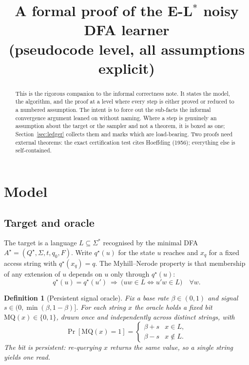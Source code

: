\documentclass[11pt]{article}
\title{A formal proof of the E-L$^*$ noisy DFA learner\\[2pt]
\large (pseudocode level, all assumptions explicit)}
\author{}
\date{}
\newtheorem{definition}{Definition}
\newcommand{\MQ}{\mathrm{MQ}}
\begin{document}
\maketitle

\begin{abstract}
This is the rigorous companion to the informal correctness note. It states the
model, the algorithm, and the proof at a level where every step is either proved
or reduced to a numbered assumption. The intent is to force out the sub-facts the
informal convergence argument leaned on without naming. Where a step is genuinely
an assumption about the target or the sampler and not a theorem, it is boxed as
one; Section~\ref{sec:ledger} collects them and marks which are load-bearing.
Two proofs need external theorems: the exact certification test cites Hoeffding
(1956); everything else is self-contained.
\end{abstract}

\section{Model}\label{sec:model}

\subsection{Target and oracle}

The target is a language $L\subseteq\Sigma^*$ recognised by the minimal DFA
$A^\star=(Q^\star,\Sigma,t,q_0,F)$. Write $q^\star(u)$ for the state $u$ reaches
and $x_q$ for a fixed access string with $q^\star(x_q)=q$. The Myhill--Nerode
property is that membership of any extension of $u$ depends on $u$ only through
$q^\star(u)$:
\begin{equation}\label{eq:mn}
  q^\star(u)=q^\star(u')\ \Longrightarrow\ \big(uw\in L\iff u'w\in L\big)\quad\forall w.
\end{equation}

\begin{definition}[Persistent signal oracle]\label{def:oracle}
Fix a base rate $\beta\in(0,1)$ and signal $s\in(0,\min(\beta,1-\beta)]$. For each
string $x$ the oracle holds a fixed bit $\MQ(x)\in\{0,1\}$, drawn once and
independently across distinct strings, with
\[
  \Pr[\MQ(x)=1]=\begin{cases}\beta+s & x\in L,\\ \beta-s & x\notin L.\end{cases}
\]
The bit is persistent: re-querying $x$ returns the same value, so a single string
yields one read.
\end{definition}
\end{document}
